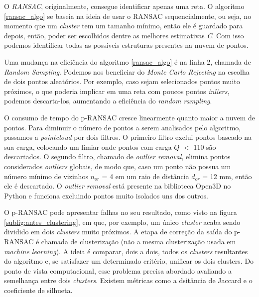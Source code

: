\documentclass[a4paper,12pt,oneside]{book}
\begin{document}
\par O \textit{RANSAC}, originalmente, consegue identificar apenas uma reta. O algoritmo \ref{ransac_algo} se baseia na ideia de usar o RANSAC sequencialmente, ou seja, no momento que um \textit{cluster} tem um tamanho mínimo, então ele é guardado para depois, então, poder ser escolhidos dentre as melhores estimativas \textit{C}. Com isso podemos identificar todas as possíveis estruturas presentes na nuvem de pontos.

\par Uma mudança na eficiência do algoritmo \ref{ransac_algo} é na linha 2, chamada de \textit{Random Sampling}. Podemos nos beneficiar do \textit{Monte Carlo Rejecting} na escolha de dois pontos aleatórios. Por exemplo, caso sejam selecionados pontos muito próximos, o que poderia implicar em uma reta com poucos pontos \textit{inliers}, podemos descarta-los, aumentando a eficiência do \textit{random rampling}.

\par O consumo de tempo do p-RANSAC cresce linearmente quanto maior a nuvem de pontos. Para diminuir o número de pontos a serem analisados pelo algoritmo, passamos a \textit{pointcloud} por dois filtros. O primeiro filtro exclui pontos baseado na sua carga, colocando um limiar onde pontos com carga $Q$ $<$ 110 são descartados. O segundo filtro, chamado de \textit{outlier removal}, elimina pontos considerados \textit{outliers} globais, de modo que, caso um ponto não possua um número mínimo de vizinhos $n_{or}$ = 4 em um raio de distância $d_{or}$ = 12 mm, então ele é descartado. O \textit{outlier removal} está presente na biblioteca Open3D\cite{open3d} no Python e funciona excluindo pontos muito isolados uns dos outros.

\par O p-RANSAC pode apresentar falhas no seu resultado, como visto na figura \ref{subfig:antes_clustering}, em que, por exemplo, um único \textit{cluster} acaba sendo dividido em dois \textit{clusters} muito próximos. A etapa de correção da saída do p-RANSAC é chamada de clusterização (não a mesma clusterização usada em \textit{machine learning}). A ideia é comparar, dois a dois, todos os \textit{clusters} resultantes do algoritmo e, se satisfazer um determinado critério, unificar os dois clusters\cite{artigo}. Do ponto de vista computacional, esse problema precisa abordado avaliando a semelhança entre dois \textit{clusters}. Existem métricas como a dsitância de Jaccard\cite{jaccard_distance} e o coeficiente de silhueta\cite{silhueta}.
\end{document}

